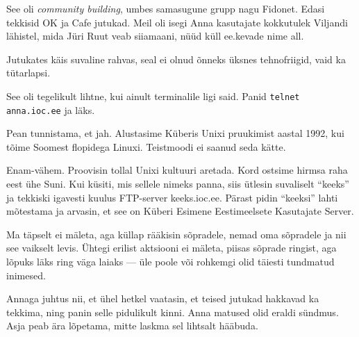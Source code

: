 
See oli \emph{community building}, umbes samasugune grupp nagu Fidonet. Edasi 
tekkisid OK  ja 
Cafe jutukad. Meil oli 
isegi Anna kasutajate kokkutulek Viljandi lähistel, mida 
Jüri Ruut veab siiamaani, nüüd küll ee.kevade nime all.

Jutukates käis suvaline rahvas, seal ei olnud õnneks üksnes tehnofriigid, vaid ka tütarlapsi. 


See oli tegelikult lihtne, kui ainult terminalile ligi said. Panid 
\verb|telnet anna.ioc.ee| ja läks. 


Pean tunnistama, et jah. Alustasime Küberis Unixi pruukimist aastal 
1992, kui tõime Soomest flopidega Linuxi. Teistmoodi ei 
saanud seda kätte. 


Enam-vähem. Proovisin tollal Unixi kultuuri aretada. Kord ostsime hirmsa
raha eest ühe Suni. Kui küsiti, mis sellele nimeks panna, siis ütlesin suvaliselt 
\enquote{keeks} ja tekkiski igavesti kuulus FTP-server keeks.ioc.ee. Pärast pidin \enquote{keeksi} lahti mõtestama ja 
arvasin, et see on Küberi Esimene Eestimeelsete Kasutajate Server.


Ma täpselt ei mäleta, aga küllap rääkisin sõpradele, nemad oma 
sõpradele ja nii see vaikselt levis. Ühtegi erilist 
aktsiooni ei mäleta, piisas sõprade ringist, aga lõpuks läks 
ring väga laiaks --- üle poole või rohkemgi olid 
täiesti tundmatud inimesed. 

Annaga juhtus nii, et ühel hetkel vaatasin, et 
teised jutukad hakkavad ka tekkima, ning panin selle pidulikult kinni. 
Anna matused olid eraldi sündmus. Asja peab ära lõpetama, mitte laskma 
sel lihtsalt hääbuda. 

